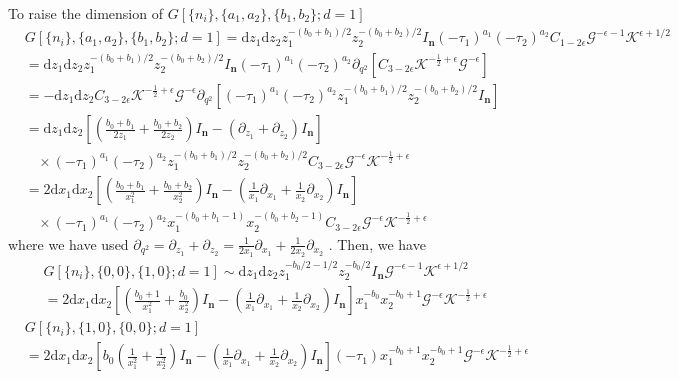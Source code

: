 \documentclass[a4paper,12pt]{article}
\newcommand{\n}{\nonumber}
\def\di{{\mathrm{d}}}
\def\ep{\epsilon}
\newcommand{\mG}{\mathcal{G}}
\newcommand{\mK}{\mathcal{K}}
\begin{document}
To raise the dimension of $G[\{n_i\},\{a_1,a_2\},\{b_1,b_2\};d=1]$
\begin{align}
&  G[\{n_i\},\{a_1,a_2\},\{b_1,b_2\};d=1]
=  \di z_1 \di z_2 z_1^{-(b_0+b_1)/2} z_2^{-(b_0+b_2)/2} I_{\bm{n}}  (-\tau_1)^{a_1}(-\tau_2)^{a_2} C_{1-2\ep} \mG^{-\ep-1} \mK^{\ep+1/2}\n\\
&= \di z_1  \di z_2  z_1^{-(b_0+b_1)/2} z_2^{-(b_0+b_2)/2} I_{\bm{n}}  (-\tau_1)^{a_1}(-\tau_2)^{a_2}  \partial_{q^2} \left[ C_{3-2\ep} \mK^{-\frac{1}{2}+\ep} \mG^{-\ep}     \right]    \n\\
& =- \di z_1  \di z_2 C_{3-2\ep} \mK^{-\frac{1}{2}+\ep} \mG^{-\ep} \partial_{q^2} \left[  (-\tau_1)^{a_1}(-\tau_2)^{a_2}    z_1^{-(b_0+b_1)/2} z_2^{-(b_0+b_2)/2}  I_{\bm{n}} \right]    \n\\
&   =   \di z_1  \di z_2 \left[ \left( \frac{b_{0}+b_1}{2 z_1} +\frac{b_{0}+b_2}{2 z_2}\right)  I_{\bm{n}} 
-  \left(\partial_{z_1}+ \partial_{z_2} \right)I_{\bm{n}} \right] \n\\
& ~~~~ \times (-\tau_1)^{a_1}(-\tau_2)^{a_2}    z_1^{-(b_0+b_1)/2} z_2^{-(b_0+b_2)/2}  C_{3-2\ep}  \mG^{-\ep} \mK^{-\frac{1}{2}+\ep}   \n\\
&=  2 \di x_1  \di x_2 \left[ \left( \frac{b_{0}+b_1}{x_1^2} +\frac{b_{0}+b_2}{x_2^2}\right)  I_{\bm{n}} 
-\left( \frac{1}{x_1}\partial_{x_1}+ \frac{1}{x_2}\partial_{x_2} \right)I_{\bm{n}} \right]  \n\\
& ~~~~ \times (-\tau_1)^{a_1}(-\tau_2)^{a_2} x_1^{-(b_0+b_1-1)} x_2^{-(b_0+b_2-1)}  C_{3-2\ep}  \mG^{-\ep} \mK^{-\frac{1}{2}+\ep}
\end{align}
where we have used $\partial_{q^2}=\partial_{z_1}+\partial_{z_2}=\frac{1}{2x_1}\partial_{x_1}+ \frac{1}{2x_2}\partial_{x_2}$ . 
Then, we have
\begin{align}
& G[\{n_i\},\{0,0\},\{1,0\};d=1]
\sim \di z_1 \di z_2 z_1^{-b_0/2-1/2} z_2^{-b_0/2} I_{\bm{n}} \mG^{-\ep-1} \mK^{\ep+1/2}\n\\
&=2 \di x_1  \di x_2 \left[ \left( \frac{b_{0}+1}{x_1^2} +\frac{b_{0}}{x_2^2}\right)  I_{\bm{n}} 
-\left( \frac{1}{x_1}\partial_{x_1}+ \frac{1}{x_2}\partial_{x_2} \right)I_{\bm{n}} \right] x_1^{-b_0} x_2^{-b_0+1}   \mG^{-\ep}\mK^{-\frac{1}{2}+\ep}
\end{align}
\begin{align}
&G[\{n_i\},\{1,0\},\{0,0\};d=1] \n\\
&=2 \di x_1  \di x_2 \left[ b_0 \left( \frac{1}{x_1^2} +\frac{1}{x_2^2}\right)  I_{\bm{n}} 
- \left( \frac{1}{x_1}\partial_{x_1}+ \frac{1}{x_2}\partial_{x_2} \right) I_{\bm{n}} \right] (-\tau_1) x_1^{-b_0+1} x_2^{-b_0+1}   \mG^{-\ep}\mK^{-\frac{1}{2}+\ep}   \n\\
\end{align}
\end{document}
